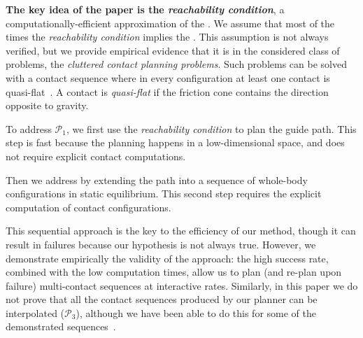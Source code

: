 \textbf{The key idea of the paper is the \textit{reachability condition}}, a computationally-efficient approximation of the .
We assume that most of the times the \textit{reachability condition} implies the .
This assumption is not always verified, but we provide empirical evidence that it is in the considered class of problems, the \textit{\gls{cluttered} contact planning problems}.
Such problems can be solved with a contact sequence 
where in every configuration at least one contact is \gls{quasi-flat}~\citep{Prete2016}. A contact is \textit{quasi-flat} if the friction cone contains the direction opposite to gravity. 

To address $\mathcal{P}_1$, we first use the \textit{reachability condition} to plan the guide path. This step is fast because the planning happens
in a low-dimensional space, and does not require explicit contact computations.

Then we address \Pb by extending the path into a sequence of whole-body configurations in static equilibrium.
This second step requires the explicit computation of contact configurations.

This sequential approach is the key to the efficiency of our method, though it
can result in failures because our hypothesis is not always true. However, we demonstrate empirically the validity of the approach: the high success rate, combined with the low computation times, allow us to plan (and re-plan upon failure) multi-contact sequences at \gls{interactive} rates.
Similarly, in this paper we do not  prove that all the contact sequences produced by our planner can be interpolated ($\mathcal{P}_3$), although we have been able to do this for some of the demonstrated sequences~\citep{Carpentier2016}. 

